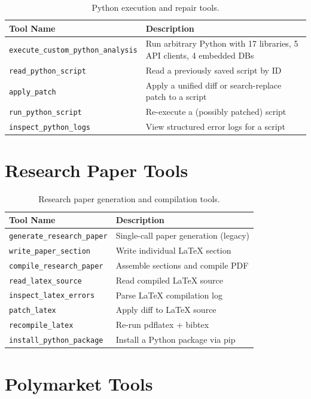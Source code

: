 \begin{longtable}{p{5.5cm}p{7.5cm}}
\caption{Python execution and repair tools.} \label{tab:tools-python} \\
\toprule
\textbf{Tool Name} & \textbf{Description} \\
\midrule
\endfirsthead
\texttt{execute\_custom\_python\_analysis} & Run arbitrary Python with 17 libraries, 5 API clients, 4 embedded DBs \\
\texttt{read\_python\_script} & Read a previously saved script by ID \\
\texttt{apply\_patch} & Apply a unified diff or search-replace patch to a script \\
\texttt{run\_python\_script} & Re-execute a (possibly patched) script \\
\texttt{inspect\_python\_logs} & View structured error logs for a script \\
\bottomrule
\end{longtable}

\section{Research Paper Tools}
\label{sec:tools:paper}

\begin{longtable}{p{5cm}p{8cm}}
\caption{Research paper generation and compilation tools.} \label{tab:tools-paper} \\
\toprule
\textbf{Tool Name} & \textbf{Description} \\
\midrule
\endfirsthead
\texttt{generate\_research\_paper} & Single-call paper generation (legacy) \\
\texttt{write\_paper\_section} & Write individual \LaTeX{} section \\
\texttt{compile\_research\_paper} & Assemble sections and compile PDF \\
\texttt{read\_latex\_source} & Read compiled \LaTeX{} source \\
\texttt{inspect\_latex\_errors} & Parse \LaTeX{} compilation log \\
\texttt{patch\_latex} & Apply diff to \LaTeX{} source \\
\texttt{recompile\_latex} & Re-run pdflatex + bibtex \\
\texttt{install\_python\_package} & Install a Python package via pip \\
\bottomrule
\end{longtable}

\section{Polymarket Tools}
\label{sec:tools:polymarket}

